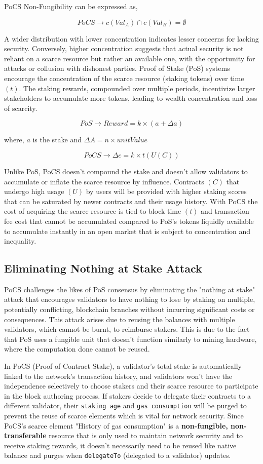 \documentclass{article}
\begin{document}
PoCS Non-Fungibility can be expressed as,

\[
PoCS \rightarrow c(Val_A) \cap c(Val_B) = \emptyset
\]

A wider distribution with lower concentration indicates lesser concerns for lacking security. Conversely, higher concentration suggests that actual security is not reliant on a scarce resource but rather an available one, with the opportunity for attacks or collusion with dishonest parties. Proof of Stake (PoS) systems encourage the concentration of the scarce resource (staking tokens) over time $(t)$. The staking rewards, compounded over multiple periods, incentivize larger stakeholders to accumulate more tokens, leading to wealth concentration and loss of scarcity.

\[
PoS \rightarrow Reward = k \times (a + \Delta a)
\]

where, $a$ is the stake and $\Delta A = n \times unitValue$

\[
PoCS \rightarrow \Delta c = k \times t(U(C))
\]

Unlike PoS, PoCS doesn't compound the stake and doesn't allow validators to accumulate or inflate the scarce resource by influence. Contracts $(C)$ that undergo high usage $(U)$ by users will be provided with higher staking scores that can be saturated by newer contracts and their usage history. With PoCS the cost of acquiring the scarce resource is tied to block time $(t)$ and transaction fee cost that cannot be accumulated compared to PoS's tokens liquidly available to accumulate instantly in an open market that is subject to concentration and inequality.

\subsection{Eliminating Nothing at Stake Attack}

PoCS challenges the likes of PoS consensus by eliminating the "nothing at stake" attack that encourages validators to have nothing to lose by staking on multiple, potentially conflicting, blockchain branches without incurring significant costs or consequences. This attack arises due to reusing the balances with multiple validators, which cannot be burnt, to reimburse stakers. This is due to the fact that PoS uses a fungible unit that doesn't function similarly to mining hardware, where the computation done cannot be reused.

In PoCS (Proof of Contract Stake), a validator's total stake is automatically linked to the network's transaction history, and validators won't have the independence selectively to choose stakers and their scarce resource to participate in the block authoring process. If stakers decide to delegate their contracts to a different validator, their \texttt{staking age} and \texttt{gas consumption} will be purged to prevent the reuse of scarce elements which is vital for network security. Since PoCS's scarce element "History of gas consumption" is a \textbf{non-fungible, non-transferable} resource that is only used to maintain network security and to receive staking rewards, it doesn't necessarily need to be reused like native balance and purges when \texttt{delegateTo} (delegated to a validator) updates.
\end{document}
